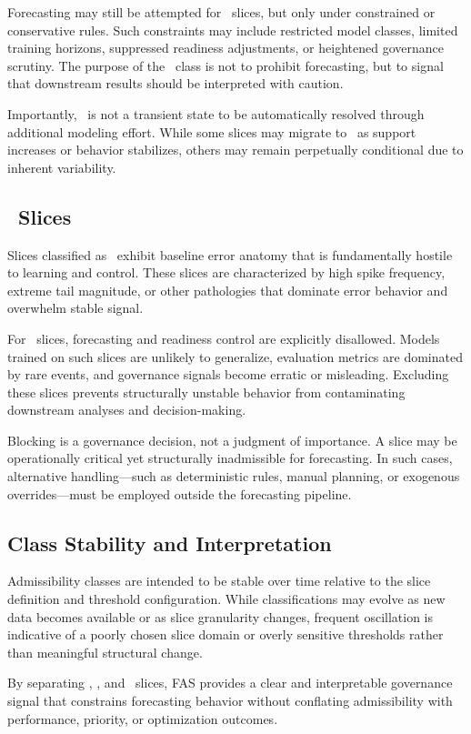 Forecasting may still be attempted for \Conditional\ slices, but only under
constrained or conservative rules. Such constraints may include restricted model
classes, limited training horizons, suppressed readiness adjustments, or
heightened governance scrutiny. The purpose of the \Conditional\ class is not to
prohibit forecasting, but to signal that downstream results should be interpreted
with caution.

Importantly, \Conditional\ is not a transient state to be automatically resolved
through additional modeling effort. While some slices may migrate to \Allowed\
as support increases or behavior stabilizes, others may remain perpetually
conditional due to inherent variability.

\subsection{\Blocked\ Slices}
\label{subsec:fas_blocked}

Slices classified as \Blocked\ exhibit baseline error anatomy that is
fundamentally hostile to learning and control. These slices are characterized by
high spike frequency, extreme tail magnitude, or other pathologies that dominate
error behavior and overwhelm stable signal.

For \Blocked\ slices, forecasting and readiness control are explicitly disallowed.
Models trained on such slices are unlikely to generalize, evaluation metrics are
dominated by rare events, and governance signals become erratic or misleading.
Excluding these slices prevents structurally unstable behavior from contaminating
downstream analyses and decision-making.

Blocking is a governance decision, not a judgment of importance. A slice may be
operationally critical yet structurally inadmissible for forecasting. In such
cases, alternative handling—such as deterministic rules, manual planning, or
exogenous overrides—must be employed outside the forecasting pipeline.

\subsection{Class Stability and Interpretation}

Admissibility classes are intended to be stable over time relative to the slice
definition and threshold configuration. While classifications may evolve as new
data becomes available or as slice granularity changes, frequent oscillation is
indicative of a poorly chosen slice domain or overly sensitive thresholds rather
than meaningful structural change.

By separating \Allowed, \Conditional, and \Blocked\ slices, FAS provides a clear
and interpretable governance signal that constrains forecasting behavior without
conflating admissibility with performance, priority, or optimization outcomes.

